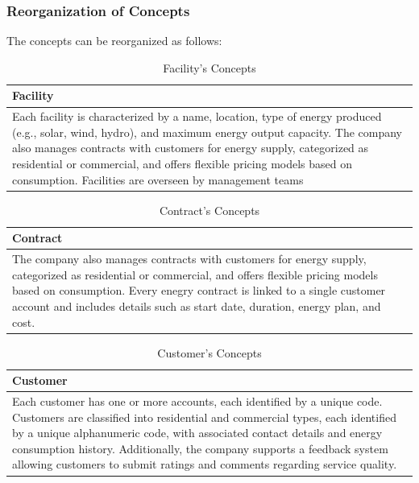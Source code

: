 \subsubsection{Reorganization of Concepts}
The concepts can be reorganized as follows:
\begin{table}[H]
    \renewcommand{\arraystretch}{1.3} %
    \begin{tabularx}{\textwidth}{|X|}
    \hline  \textbf{Facility}    \\ \hline
    Each facility is characterized by a name, location, type of energy produced (e.g., solar, wind, hydro), and maximum energy output capacity. The company also manages contracts with customers for energy supply, categorized as residential or commercial, and offers flexible pricing models based on consumption. Facilities are overseen by management teams \\ \hline
    \end{tabularx}
    \caption{Facility's Concepts}
    \end{table}

\begin{table}[H]
    \renewcommand{\arraystretch}{1.3} %
    \begin{tabularx}{\textwidth}{|X|}
    \hline  \textbf{Contract}    \\ \hline
    The company also manages contracts with customers for energy supply, categorized as residential or commercial, and offers flexible pricing models based on consumption.
    Every enegry contract is linked to a single customer account and includes details such as start date, duration, energy plan, and cost. \\ \hline
    \end{tabularx}
    \caption{Contract's Concepts}
    \end{table}

\begin{table}[H]
    \renewcommand{\arraystretch}{1.3} %
    \begin{tabularx}{\textwidth}{|X|}
    \hline  \textbf{Customer}    \\ \hline
    Each customer has one or more accounts, each identified by a unique code. Customers are classified into residential and commercial types, each identified by a unique alphanumeric code, with associated contact details and energy consumption history. Additionally, the company supports a feedback system allowing customers to submit ratings and comments regarding service quality. \\ \hline
    \end{tabularx}
    \caption{Customer's Concepts}
    \end{table}

